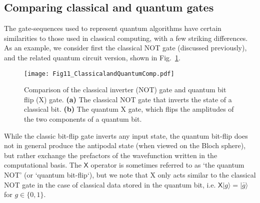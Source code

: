 \documentclass[aip,apr,twocolumn,showpacs,superscriptaddress,groupedaddress,nofootinbib,reprint]{revtex4-1}  %
\begin{document}
\subsection{\label{sec:GatesInQC}Comparing classical and quantum gates}
The gate-sequences used to represent quantum algorithms have certain similarities to those used in classical computing, with a few striking differences. As an example, we consider first the classical \textsf{NOT} gate (discussed previously), and the related quantum circuit version, shown in Fig.~\ref{fig:ClassicalVQuantum_circuits}.

\begin{figure}[!t]
\centering
\texttt{[image: Fig11\_ClassicalandQuantumComp.pdf]}
\caption{Comparison of the classical inverter (\textsf{NOT}) gate and quantum bit flip (\textsf{X}) gate. \textbf{(a)} The classical \textsf{NOT} gate that inverts the state of a classical bit. \textbf{(b)} The quantum \textsf{X} gate, which flips the amplitudes of the two components of a quantum bit.}
\label{fig:ClassicalVQuantum_circuits}
\end{figure}
While the classic bit-flip gate inverts any input state, the quantum bit-flip does not in general produce the antipodal state (when viewed on the Bloch sphere), but rather exchange the prefactors of the wavefunction written in the computational basis. The $\mathsf{X}$ operator is sometimes referred to as `the quantum NOT' (or `quantum bit-flip`), but we note that \textsf{X} only acts similar to the classical \textsf{NOT} gate in the case of classical data stored in the quantum bit, i.e. $\textsf{X}|g\rangle = |\bar g\rangle$ for $g\in\{0,1\}$.
\end{document}
